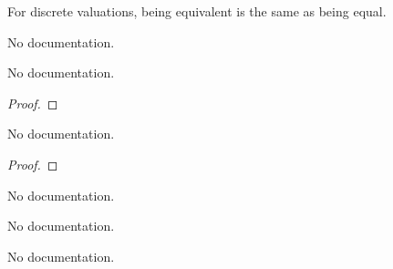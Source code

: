 \begin{theorem}\label{isEquiv_iff_eq}
                For discrete valuations, being equivalent is the same as being equal.
    \end{theorem}

\begin{definition}\label{Valuation.Nontrivial}
        \leanok
                No documentation.
    \end{definition}

\begin{theorem}\label{Valuation.nontrivial_def}
        \leanok
                No documentation.
    \end{theorem}

\begin{proof}
    \leanok
\end{proof}

\begin{theorem}\label{DiscreteValuation.valuationSubring_DVR_of_equiv_discrete}
        \leanok
                No documentation.
    \end{theorem}

\begin{proof}
    \leanok
\end{proof}

\begin{definition}\label{DiscreteValuation.ofNontrivial}
                No documentation.
    \end{definition}

\begin{theorem}\label{DiscreteValuation.isEquiv_ofNontrivial}
                No documentation.
    \end{theorem}

\begin{theorem}\label{Polynomial.hasseDeriv_coeff_zero}
        \leanok
                No documentation.
    \end{theorem}

